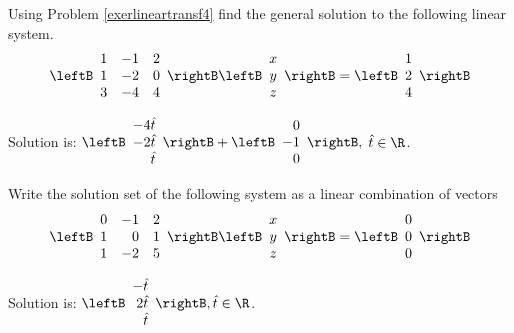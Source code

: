 \begin{enumialphparenastyle}
\begin{ex} Using Problem \ref{exerlineartransf4} find the general solution to the
following linear system. 
\begin{equation*}
\leftB
\begin{array}{rrr}
1 & -1 & 2 \\
1 & -2 & 0 \\
3 & -4 & 4
\end{array}
\rightB \leftB
\begin{array}{c}
x \\
y \\
z
\end{array}
\rightB =\leftB
\begin{array}{r}
1 \\
2 \\
4
\end{array}
\rightB 
\end{equation*}
\begin{sol}
Solution is: $\leftB
\begin{array}{r}
-4\hat{t} \\
-2\hat{t} \\
\hat{t}
\end{array}
\rightB +\leftB
\begin{array}{r}
0 \\
-1 \\
0
\end{array}
\rightB ,$ $\hat{t}\in \R$.
\end{sol}
\end{ex}

\begin{ex} \label{exerlineartransf5}Write the solution set of the following system as a linear combination of vectors 
\begin{equation*}
\leftB
\begin{array}{rrr}
0 & -1 & 2 \\
1 & 0 & 1 \\
1 & -2 & 5
\end{array}
\rightB \leftB
\begin{array}{c}
x \\
y \\
z
\end{array}
\rightB =\leftB
\begin{array}{c}
0 \\
0 \\
0
\end{array}
\rightB 
\end{equation*}
\begin{sol}
Solution is: $\leftB
\begin{array}{r}
-\hat{t} \\
2\hat{t} \\
\hat{t}
\end{array}
\rightB ,\hat{t}\in \R$.
\end{sol}
\end{ex}


\end{enumialphparenastyle}
